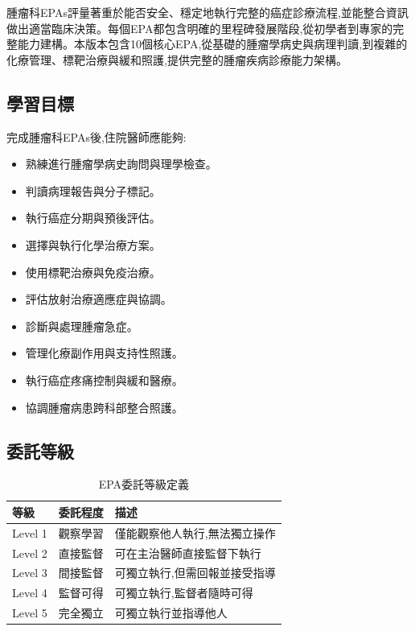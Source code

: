 \documentclass[12pt,a4paper]{article}
\newcommand{\note}[1]{
    \par
    \noindent
    \begin{tcolorbox}[
        colback=onco_gold!5!white,
        colframe=onco_gold,
        title=\textbf{重點提醒},
        fonttitle=\bfseries,
        boxrule=0.5pt,
        arc=3pt,
        left=6pt,
        right=6pt,
        top=6pt,
        bottom=6pt
    ]
    #1
    \end{tcolorbox}
}
\begin{document}
\vspace{0.5cm}
\note{
腫瘤科EPAs評量著重於能否安全、穩定地執行完整的癌症診療流程,並能整合資訊做出適當臨床決策。每個EPA都包含明確的里程碑發展階段,從初學者到專家的完整能力建構。本版本包含10個核心EPA,從基礎的腫瘤學病史與病理判讀,到複雜的化療管理、標靶治療與緩和照護,提供完整的腫瘤疾病診療能力架構。
}

\subsection{學習目標}
完成腫瘤科EPAs後,住院醫師應能夠:
\begin{itemize}[nosep]
    \item 熟練進行腫瘤學病史詢問與理學檢查。
    \item 判讀病理報告與分子標記。
    \item 執行癌症分期與預後評估。
    \item 選擇與執行化學治療方案。
    \item 使用標靶治療與免疫治療。
    \item 評估放射治療適應症與協調。
    \item 診斷與處理腫瘤急症。
    \item 管理化療副作用與支持性照護。
    \item 執行癌症疼痛控制與緩和醫療。
    \item 協調腫瘤病患跨科部整合照護。
\end{itemize}

\subsection{委託等級}
\begin{table}[h]
    \centering
    \caption{EPA委託等級定義}
    \begin{tabular}{p{2cm} p{3cm} p{9cm}}
        \toprule
        \textbf{等級} & \textbf{委託程度} & \textbf{描述} \\
        \midrule
        Level 1 & 觀察學習 & 僅能觀察他人執行,無法獨立操作 \\
        Level 2 & 直接監督 & 可在主治醫師直接監督下執行 \\
        Level 3 & 間接監督 & 可獨立執行,但需回報並接受指導 \\
        Level 4 & 監督可得 & 可獨立執行,監督者隨時可得 \\
        Level 5 & 完全獨立 & 可獨立執行並指導他人 \\
        \bottomrule
    \end{tabular}
\end{table}
\end{document}
